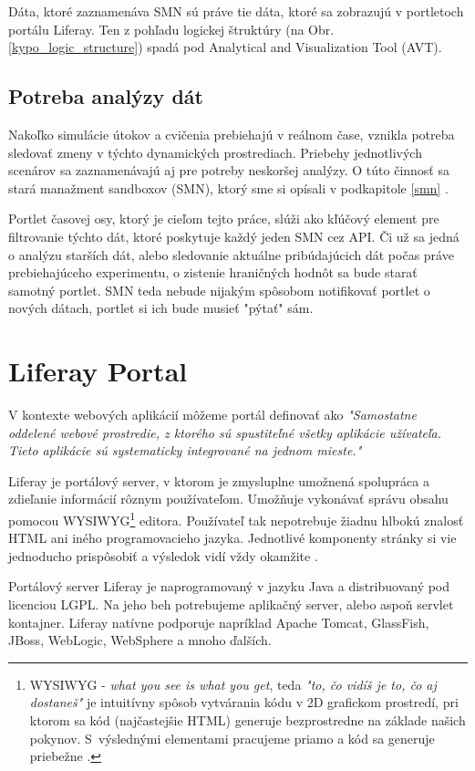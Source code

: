 \documentclass[
  digital, %
  twoside, %
  notable,   %
  nolof,   %
  nolot,   %
]{fithesis3}
\newcommand{\inquotes}[1]{{}"{}#1{}"{}}
\begin{document}
Dáta, ktoré zaznamenáva SMN sú práve tie dáta, ktoré sa zobrazujú v portletoch portálu Liferay. Ten z pohľadu logickej štruktúry (na Obr. \ref{kypo_logic_structure}) spadá pod Analytical and Visualization Tool (AVT).

\section{Potreba analýzy dát}
Nakoľko simulácie útokov a cvičenia prebiehajú v reálnom čase, vznikla potreba sledovať zmeny v týchto dynamických prostrediach. Priebehy jednotlivých scenárov sa zaznamenávajú aj pre potreby neskoršej analýzy. O túto činnosť sa stará manažment sandboxov (SMN), ktorý sme si opísali v podkapitole \ref{smn} .

Portlet časovej osy, ktorý je cieľom tejto práce, slúži ako kľúčový element pre filtrovanie týchto dát, ktoré poskytuje každý jeden SMN cez API. Či už sa jedná o analýzu starších dát, alebo sledovanie aktuálne pribúdajúcich dát počas práve prebiehajúceho experimentu, o zistenie hraničných hodnôt sa bude starať samotný portlet. SMN teda nebude nijakým spôsobom notifikovať portlet o nových dátach, portlet si ich bude musieť \inquotes{pýtať} sám.

\chapter{Liferay Portal}
\label{liferay}
V kontexte webových aplikácií môžeme portál definovať \cite{sezov2011liferay} ako \textit{"Samostatne oddelené webové prostredie, z ktorého sú spustiteľné všetky aplikácie užívateľa. Tieto aplikácie sú systematicky integrované na jednom mieste."}

Liferay je portálový server, v ktorom je zmysluplne umožnená spolupráca a zdieľanie informácií rôznym používateľom. Umožňuje vykonávať správu obsahu pomocou WYSIWYG\footnote{WYSIWYG - \textit{what you see is what you get}, teda \textit{"to, čo vidíš je to, čo aj dostaneš"} je intuitívny spôsob vytvárania kódu v 2D grafickom prostredí, pri ktorom sa kód (najčastejšie HTML) generuje bezprostredne na základe našich pokynov. S~výslednými elementami pracujeme priamo a kód sa generuje priebežne \cite{guo2011wysiwyg}.} editora. Používateľ tak nepotrebuje žiadnu hlbokú znalosť HTML ani iného programovacieho jazyka. Jednotlivé komponenty stránky si vie jednoducho prispôsobiť a výsledok vidí vždy okamžite \cite{sezov2011liferay}.

Portálový server Liferay je naprogramovaný v jazyku Java a distribuovaný pod licenciou LGPL. Na jeho beh potrebujeme aplikačný server, alebo aspoň servlet kontajner. Liferay natívne podporuje napríklad Apache Tomcat, GlassFish, JBoss, WebLogic, WebSphere a mnoho ďalších.
\end{document}

